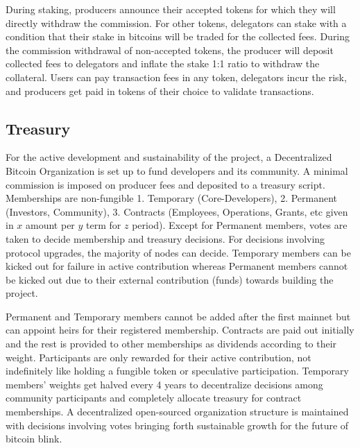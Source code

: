 \documentclass[a4paper, 10pt]{extarticle}
\begin{document}
During staking, producers announce their accepted tokens for which they will directly withdraw the commission. For other tokens, delegators can stake with a condition that their stake in bitcoins will be traded for the collected fees. During the commission withdrawal of non-accepted tokens, the producer will deposit collected fees to delegators and inflate the stake 1:1 ratio to withdraw the collateral. Users can pay transaction fees in any token, delegators incur the risk, and producers get paid in tokens of their choice to validate transactions.
\subsection{Treasury}
For the active development and sustainability of the project, a Decentralized Bitcoin Organization is set up to fund developers and its community. A minimal commission is imposed on producer fees and deposited to a treasury script. Memberships are non-fungible 1. Temporary (Core-Developers), 2. Permanent (Investors, Community), 3. Contracts (Employees, Operations, Grants, etc given in $x$ amount per $y$ term for $z$ period). Except for Permanent members, votes are taken to decide membership and treasury decisions. For decisions involving protocol upgrades, the majority of nodes can decide. Temporary members can be kicked out for failure in active contribution whereas Permanent members cannot be kicked out due to their external contribution (funds) towards building the project.

 Permanent and Temporary members cannot be added after the first mainnet but can appoint heirs for their registered membership. Contracts are paid out initially and the rest is provided to other memberships as dividends according to their weight. Participants are only rewarded for their active contribution, not indefinitely like holding a fungible token or speculative participation. Temporary members' weights get halved every 4 years to decentralize decisions among community participants and completely allocate treasury for contract memberships. A decentralized open-sourced organization structure is maintained with decisions involving votes bringing forth sustainable growth for the future of bitcoin blink.
\end{document}
